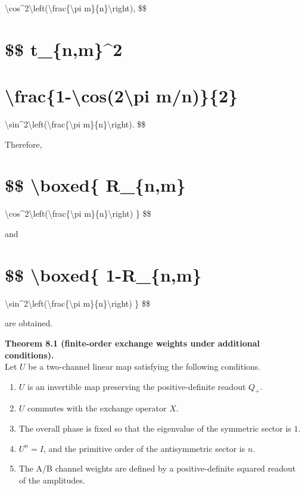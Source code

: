 \documentclass[
  a4paper,
  10pt]{article}
\providecommand{\tightlist}{%
  \setlength{\itemsep}{0pt}\setlength{\parskip}{0pt}}
\begin{document}
\textbackslash cos\^{}2\textbackslash left(\textbackslash frac\{\textbackslash pi
m\}\{n\}\textbackslash right), \$\$

\section{\$\$ \textbar t\_\{n,m\}\textbar\^{}2}\label{-t_nm2}

\section{\textbackslash frac\{1-\textbackslash cos(2\textbackslash pi
m/n)\}\{2\}}\label{frac1-cos2pi-mn2}

\textbackslash sin\^{}2\textbackslash left(\textbackslash frac\{\textbackslash pi
m\}\{n\}\textbackslash right). \$\$

Therefore,

\section{\$\$ \textbackslash boxed\{ R\_\{n,m\}}\label{-boxed-r_nm}

\textbackslash cos\^{}2\textbackslash left(\textbackslash frac\{\textbackslash pi
m\}\{n\}\textbackslash right) \} \$\$

and

\section{\$\$ \textbackslash boxed\{ 1-R\_\{n,m\}}\label{-boxed-1-r_nm}

\textbackslash sin\^{}2\textbackslash left(\textbackslash frac\{\textbackslash pi
m\}\{n\}\textbackslash right) \} \$\$

are obtained.

\textbf{Theorem 8.1 (finite-order exchange weights under additional
conditions).}\\
Let \(U\) be a two-channel linear map satisfying the following
conditions.

\begin{enumerate}
\def\labelenumi{\arabic{enumi}.}
\tightlist
\item
  \(U\) is an invertible map preserving the positive-definite readout
  \(Q_+\).
\item
  \(U\) commutes with the exchange operator \(X\).
\item
  The overall phase is fixed so that the eigenvalue of the symmetric
  sector is \(1\).
\item
  \(U^n=I\), and the primitive order of the antisymmetric sector is
  \(n\).
\item
  The A/B channel weights are defined by a positive-definite squared
  readout of the amplitudes.
\end{enumerate}
\end{document}

